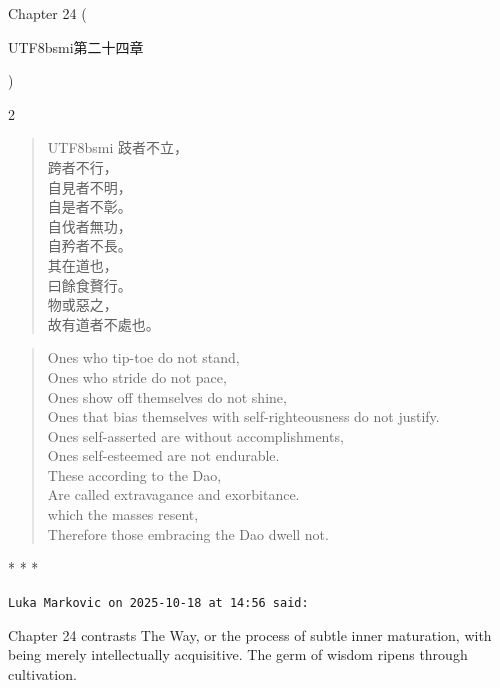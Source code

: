 Chapter 24 (\begin{CJK*}{UTF8}{bsmi}第二十四章\end{CJK*})
\begin{paracol}{2}
\begin{verse}
\begin{CJK*}{UTF8}{bsmi}
跂者不立，\\
跨者不行，\\
自見者不明，\\
自是者不彰。\\
自伐者無功，\\
自矜者不長。\\
其在道也，\\
曰餘食贅行。\\
物或惡之，\\
故有道者不處也。
\end{CJK*}
\end{verse}
\switchcolumn
\begin{verse}
Ones who tip-toe do not stand,\\
Ones who stride do not pace,\\
Ones show off themselves do not shine,\\
Ones that bias themselves with self-righteousness do not justify.\\
Ones self-asserted are without accomplishments,\\
Ones self-esteemed are not endurable.\\
These according to the Dao,\\
Are called extravagance and exorbitance.\\
which the masses resent,\\
Therefore those embracing the Dao dwell not.
\end{verse}
\end{paracol}


\begin{center}* * *\end{center}

\begin{footnotesize}
\begin{sffamily}
\texttt{Luka Markovic on 2025-10-18 at 14:56 said:}

Chapter 24 contrasts The Way, or the process of subtle inner maturation, with being merely intellectually acquisitive. The germ of wisdom ripens through cultivation.

\end{sffamily}
\end{footnotesize}

